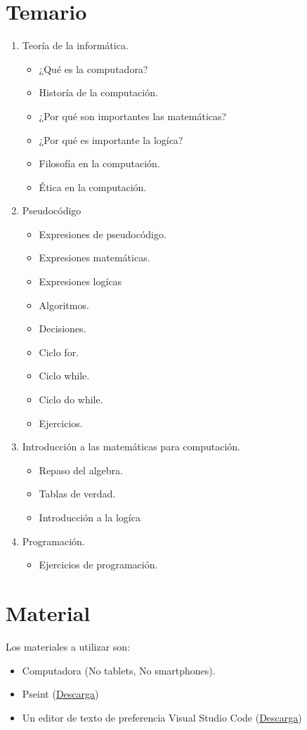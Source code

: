 \documentclass[12pt, letterpaper]{article}
\begin{document}
\section{Temario}
\begin{enumerate}
  \item Teoría de la informática.
    \begin{itemize}
      \item ¿Qué es la computadora?	
      \item Historía de la computación.
      \item ¿Por qué son importantes las matemáticas?
      \item ¿Por qué es importante la logíca?
      \item Filosofía en la computación.
      \item Ética en la computación.
    \end{itemize} 
  \item Pseudocódigo
    \begin{itemize}
      \item Expresiones de pseudocódigo.
      \item Expresiones matemáticas.
      \item Expresiones logícas
      \item Algoritmos.
      \item Decisiones.
      \item Ciclo for.
      \item Ciclo while.
      \item Ciclo do while.
      \item Ejercicios.
    \end{itemize}
  \item Introducción a las matemáticas para computación.
    \begin{itemize}
      \item Repaso del algebra.	
      \item Tablas de verdad.
      \item Introducción a la logíca
    \end{itemize}
  \item Programación.
    \begin{itemize}
      \item Ejercicios de programación.	
    \end{itemize}
\end{enumerate}
\section{Material}
Los materiales a utilizar son:
\begin{itemize}
  \item Computadora (No tablets, No smartphones).
  \item Pseint (\href{http://pseint.sourceforge.net/}{Descarga})
  \item Un editor de texto de preferencia Visual Studio Code (\href{https://code.visualstudio.com/download}{Descarga})
\end{itemize}
\end{document}
